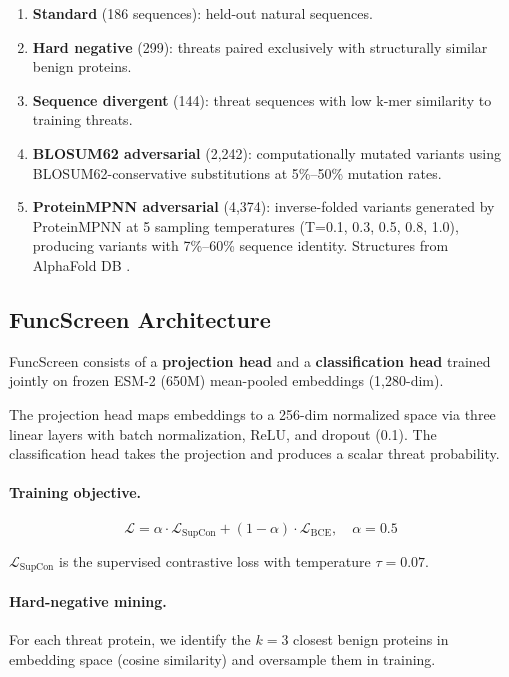 \documentclass[11pt,a4paper]{article}
\begin{document}
\begin{enumerate}[leftmargin=*]
    \item \textbf{Standard} (186 sequences): held-out natural sequences.
    \item \textbf{Hard negative} (299): threats paired exclusively with structurally similar benign proteins.
    \item \textbf{Sequence divergent} (144): threat sequences with low k-mer similarity to training threats.
    \item \textbf{BLOSUM62 adversarial} (2,242): computationally mutated variants using BLOSUM62-conservative substitutions at 5\%--50\% mutation rates.
    \item \textbf{ProteinMPNN adversarial} (4,374): inverse-folded variants generated by ProteinMPNN at 5 sampling temperatures (T=0.1, 0.3, 0.5, 0.8, 1.0), producing variants with 7\%--60\% sequence identity. Structures from AlphaFold DB \cite{jumper2021highly}.
\end{enumerate}

\subsection{FuncScreen Architecture}

FuncScreen consists of a \textbf{projection head} and a \textbf{classification head} trained jointly on frozen ESM-2 (650M) mean-pooled embeddings (1,280-dim).

The projection head maps embeddings to a 256-dim normalized space via three linear layers with batch normalization, ReLU, and dropout (0.1). The classification head takes the projection and produces a scalar threat probability.

\paragraph{Training objective.}
\begin{equation}
    \mathcal{L} = \alpha \cdot \mathcal{L}_{\text{SupCon}} + (1 - \alpha) \cdot \mathcal{L}_{\text{BCE}}, \quad \alpha = 0.5
\end{equation}

$\mathcal{L}_{\text{SupCon}}$ is the supervised contrastive loss \cite{khosla2020supervised} with temperature $\tau = 0.07$.

\paragraph{Hard-negative mining.} For each threat protein, we identify the $k=3$ closest benign proteins in embedding space (cosine similarity) and oversample them in training.
\end{document}
